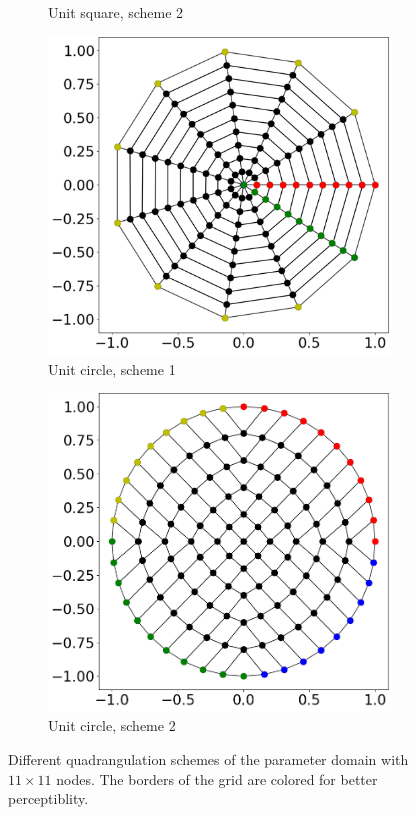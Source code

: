 \begin{figure}
\begin{subfigure}[t]{0.48\textwidth}
    \caption{Unit square, scheme 2}%
    \label{fig:quad_2}%
  \end{subfigure}
  \begin{subfigure}[t]{0.48\textwidth}%
    \centering%
    \includegraphics[width=\textwidth]{images/fiber_creation/quad_0.png}%
    \caption{Unit circle, scheme 1}%
    \label{fig:quad_0}%
  \end{subfigure}
  \quad
  \begin{subfigure}[t]{0.48\textwidth}%
    \centering%
    \includegraphics[width=\textwidth]{images/fiber_creation/quad_3.png}%
    \caption{Unit circle, scheme 2}%
    \label{fig:quad_3}%
  \end{subfigure}
  \caption{Different quadrangulation schemes of the parameter domain with $11\times 11$ nodes. The borders of the grid are colored for better perceptiblity.}%
  \label{fig:quads}%
\end{figure}%

